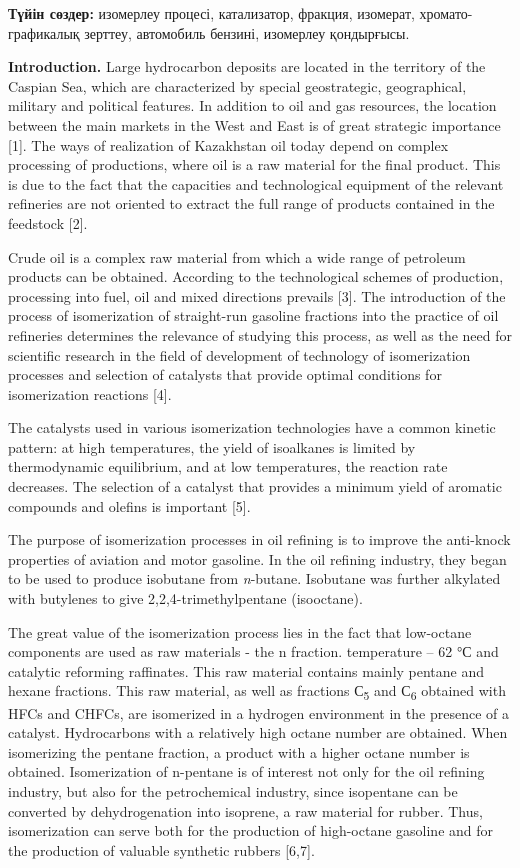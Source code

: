 {\bfseries Түйін сөздер:} изомерлеу процесі, катализатор, фракция,
изомерат, хромато-графикалық зерттеу, автомобиль бензині, изомерлеу
қондырғысы.

{\bfseries Introduction.} Large hydrocarbon deposits are located in the
territory of the Caspian Sea, which are characterized by special
geostrategic, geographical, military and political features. In addition
to oil and gas resources, the location between the main markets in the
West and East is of great strategic importance {[}1{]}. The ways of
realization of Kazakhstan oil today depend on complex processing of
productions, where oil is a raw material for the final product. This is
due to the fact that the capacities and technological equipment of the
relevant refineries are not oriented to extract the full range of
products contained in the feedstock {[}2{]}.

Crude oil is a complex raw material from which a wide range of petroleum
products can be obtained. According to the technological schemes of
production, processing into fuel, oil and mixed directions prevails
{[}3{]}. The introduction of the process of isomerization of
straight-run gasoline fractions into the practice of oil refineries
determines the relevance of studying this process, as well as the need
for scientific research in the field of development of technology of
isomerization processes and selection of catalysts that provide optimal
conditions for isomerization reactions {[}4{]}.

The catalysts used in various isomerization technologies have a common
kinetic pattern: at high temperatures, the yield of isoalkanes is
limited by thermodynamic equilibrium, and at low temperatures, the
reaction rate decreases. The selection of a catalyst that provides a
minimum yield of aromatic compounds and olefins is important {[}5{]}.

The purpose of isomerization processes in oil refining is to improve the
anti-knock properties of aviation and motor gasoline. In the oil
refining industry, they began to be used to produce isobutane from
\emph{n}-butane. Isobutane was further alkylated with butylenes to give
2,2,4-trimethylpentane (isooctane).

The great value of the isomerization process lies in the fact that
low-octane components are used as raw materials - the n fraction.
temperature -- 62 °С and catalytic reforming raffinates. This raw
material contains mainly pentane and hexane fractions. This raw
material, as well as fractions С\textsubscript{5} and С\textsubscript{6}
obtained with HFCs and CHFCs, are isomerized in a hydrogen environment
in the presence of a catalyst. Hydrocarbons with a relatively high
octane number are obtained. When isomerizing the pentane fraction, a
product with a higher octane number is obtained. Isomerization of
n-pentane is of interest not only for the oil refining industry, but
also for the petrochemical industry, since isopentane can be converted
by dehydrogenation into isoprene, a raw material for rubber. Thus,
isomerization can serve both for the production of high-octane gasoline
and for the production of valuable synthetic rubbers {[}6,7{]}.

